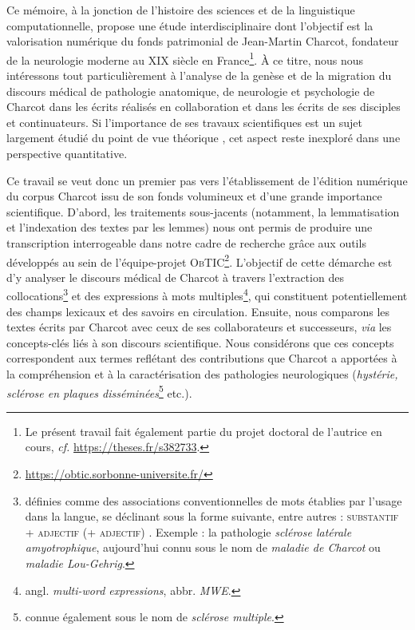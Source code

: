 \label{intro}
Ce mémoire, à la jonction de l'histoire des sciences et de la linguistique computationnelle, propose une étude interdisciplinaire dont l'objectif est la valorisation numérique du fonds patrimonial de Jean-Martin Charcot, fondateur de la neurologie moderne au XIX\ieme{} siècle en France\footnote{Le présent travail fait également partie du projet doctoral de l'autrice en cours, \textit{cf.} \url{https://theses.fr/s382733}.}. À ce titre, nous nous intéressons tout particulièrement à l'analyse de la genèse et de la migration du discours médical de pathologie anatomique, de neurologie et psychologie de Charcot dans les écrits réalisés en collaboration et dans les écrits de ses disciples et continuateurs. Si l'importance de ses travaux scientifiques est un sujet largement étudié du point de vue théorique \citep{bogousslavsky2011following,broussolle2012,camargo2024}, 
cet aspect reste inexploré dans une perspective quantitative.

Ce travail se veut donc un premier pas vers l'établissement de l'édition numérique du corpus Charcot issu de son fonds volumineux et d'une grande importance scientifique. D'abord, les traitements sous-jacents (notamment, la lemmatisation et l'indexation des textes par les lemmes) nous ont permis de produire une transcription interrogeable dans notre cadre de recherche grâce aux outils développés au sein de l'équipe-projet \textsc{ObTIC}\footnote{\url{https://obtic.sorbonne-universite.fr/}}. L'objectif de cette démarche est d'y analyser le discours médical de Charcot à travers l'extraction des collocations\footnote{définies comme des \og{}associations conventionnelles de mots établies par l'usage dans la langue\fg{}, se déclinant sous la forme suivante, entre autres : \textsc{substantif + adjectif (+ adjectif)} \citep[p. 100]{nerima2006}. Exemple : la pathologie \textit{sclérose latérale amyotrophique}, aujourd'hui connu sous le nom de \textit{maladie de Charcot} ou \textit{maladie Lou-Gehrig}.} et des expressions à mots multiples\footnote{angl. \textit{multi-word expressions}, abbr. \textit{\textsc{MWE}}.}, qui constituent potentiellement des champs lexicaux et des savoirs en circulation. Ensuite, nous comparons les textes écrits par Charcot avec ceux de ses collaborateurs et successeurs, \textit{via} les concepts-clés liés à son discours scientifique. Nous considérons que ces concepts correspondent aux termes reflétant des contributions que Charcot a apportées à la compréhension et à la caractérisation des pathologies neurologiques (\textit{hystérie, sclérose en plaques disséminées}\footnote{connue également sous le nom de \textit{sclérose multiple}.} etc.). 

